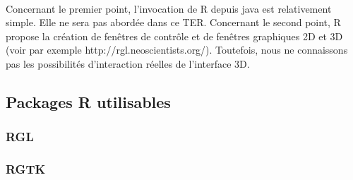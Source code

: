 \paragraph{}
Concernant le premier point, l'invocation de R depuis java est relativement simple. Elle ne sera pas
abordée dans ce TER. Concernant le second point, R propose la création de fenêtres de contrôle et
de fenêtres graphiques 2D et 3D (voir par exemple http://rgl.neoscientists.org/). Toutefois, nous ne
connaissons pas les possibilités d'interaction réelles de l'interface 3D.
%

\newpage
\subsection{Packages R utilisables}
\subsubsection{RGL}

\subsubsection{RGTK}
%
\newpage